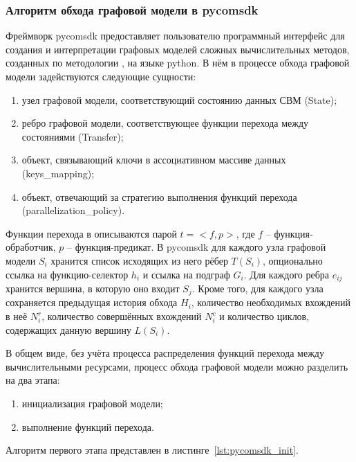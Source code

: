 \def\notedate{2023.01.22}
\def\currentauthor{Тришин И.В. (РК6-11М)}
\subsubsection{Алгоритм обхода графовой модели в pycomsdk}
Фреймворк pycomsdk предоставляет пользователю программный интерфейс для создания и интерпретации графовых моделей сложных вычислительных методов, созданных по методологии , на языке python. В нём в процессе обхода графовой модели задействуются следующие сущности:
\begin{enumerate}[label=\arabic*)]
	\item узел графовой модели, соответствующий состоянию данных СВМ (State);
	\item ребро графовой модели, соответствующее функции перехода между состояниями (Transfer);
	\item объект, связывающий ключи в ассоциативном массиве данных (keys_mapping);
	\item объект, отвечающий за стратегию выполнения функций перехода (parallelization_policy).
\end{enumerate}
Функции перехода в  описываются парой $t = <f, p>$, где $f$ -- функция-обработчик, $p$ -- функция-предикат.
В pycomsdk для каждого узла графовой модели $S_i$ хранится список исходящих из него рёбер $T(S_i)$, опционально ссылка на функцию-селектор\cite{SokolovPershin2018} $h_i$ и ссылка на подграф $G_i$. Для каждого ребра $e_{ij}$ хранится вершина, в которую оно входит $S_j$. Кроме того, для каждого узла сохраняется предыдущая история обхода $H_i$, количество необходимых вхождений в неё $N_i^r$, количество совершённых вхождений $N_i^c$ и количество циклов, содержащих данную вершину $L(S_i)$.

В общем виде, без учёта процесса распределения функций перехода между вычислительными ресурсами, процесс обхода графовой модели можно разделить на два этапа:
\begin{enumerate}[label=\arabic*)]
	\item инициализация графовой модели;
	\item выполнение функций перехода.
\end{enumerate}

Алгоритм первого этапа представлен в листинге~\ref{lst:pycomsdk_init}.


